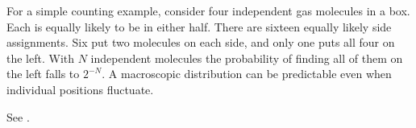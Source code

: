 For a simple counting example, consider four
independent gas molecules in a box. Each is
equally likely to be in either half. There
are sixteen equally likely side assignments.
Six put two molecules on each side, and only
one puts all four on the left. With $N$
independent molecules the probability of
finding all of them on the left falls to
$2^{-N}$. A macroscopic distribution can be
predictable even when individual positions
fluctuate.

See \cite[Vol. I, Sections 44-1, 44-6 and
45-1]{feynman-lectures}.





